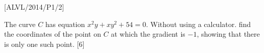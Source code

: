 \item {[}ALVL/2014/P1/2{]}

The curve $C$ has equation $x^{2}y+xy^{2}+54=0$. Without using a
calculator. find the coordinates of the point on $C$ at which the
gradient is $-1$, showing that there is only one such point. \hfill{}{[}6{]}
